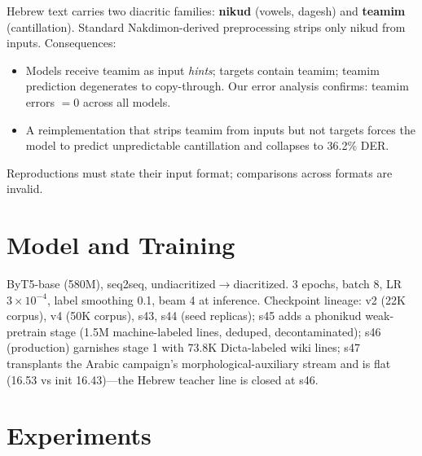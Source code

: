 \documentclass[11pt]{article}
\begin{document}
Hebrew text carries two diacritic families: \textbf{nikud} (vowels,
dagesh) and \textbf{teamim} (cantillation). Standard Nakdimon-derived
preprocessing strips only nikud from inputs. Consequences:
\begin{itemize}
  \item Models receive teamim as input \emph{hints}; targets contain
        teamim; teamim prediction degenerates to copy-through.
        Our error analysis confirms: teamim errors $=0$ across all
        models.
  \item A reimplementation that strips teamim from inputs but not
        targets forces the model to predict unpredictable cantillation
        and collapses to 36.2\% DER.
\end{itemize}
Reproductions must state their input format; comparisons across formats
are invalid.

\section{Model and Training}
ByT5-base (580M), seq2seq, undiacritized$\to$diacritized. 3 epochs,
batch 8, LR $3{\times}10^{-4}$, label smoothing 0.1, beam 4 at
inference. Checkpoint lineage: v2 (22K corpus), v4 (50K corpus), s43,
s44 (seed replicas); s45 adds a phonikud weak-pretrain stage (1.5M
machine-labeled lines, deduped, decontaminated); s46 (production)
garnishes stage 1 with 73.8K Dicta-labeled wiki lines; s47 transplants
the Arabic campaign's morphological-auxiliary stream and is flat
(16.53 vs init 16.43)---the Hebrew teacher line is closed at s46.

\section{Experiments}
\end{document}
